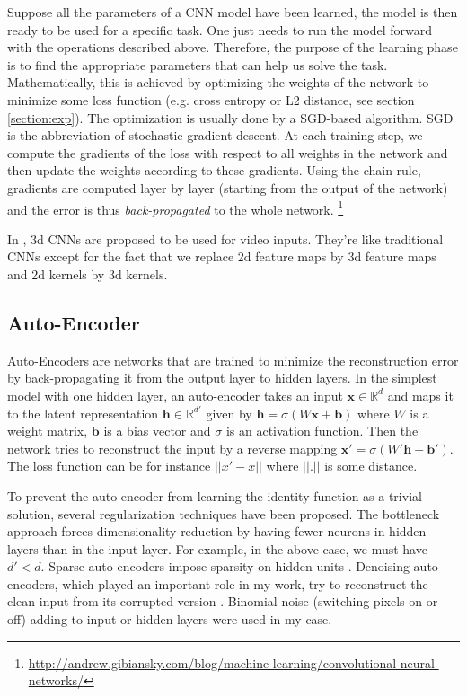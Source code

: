 Suppose all the parameters of a CNN model have been learned, the model
is then ready to be used for a specific task. One just needs to run the
model forward with the operations described above. Therefore,
the purpose of the learning
phase is to find the appropriate parameters that can help us solve the task.
Mathematically, this is achieved by optimizing the weights of the network
to minimize some loss function (e.g. cross entropy
or L2 distance, see section \ref{section:exp}).
The optimization is usually done by a SGD-based algorithm.
SGD is the abbreviation of stochastic gradient descent. At each
training step, we compute the gradients of the loss with respect to all
weights in the network and then update the weights according to these
gradients. Using the chain rule, gradients are computed layer by
layer (starting from the output of the network) and the error is thus
\textit{back-propagated} to the whole network.%
\footnote{
\href{http://andrew.gibiansky.com/blog/machine-learning/convolutional-neural-networks/}
{http://andrew.gibiansky.com/blog/machine-learning/convolutional-neural-networks/}}

In \cite{S. Ji 2013}, 3d CNNs are proposed to be used for video inputs.
They're like traditional CNNs except for the fact that we replace
2d feature maps by 3d feature maps and 2d kernels by 3d kernels.

\subsection{Auto-Encoder} \label{subsection:AE}

Auto-Encoders are networks that are trained to minimize the reconstruction
error by back-propagating it from the output layer to hidden layers.
In the simplest model with one hidden layer, an auto-encoder takes an
input $\mathbf{x} \in \mathbb{R}^d$ and maps it to the latent
representation $\mathbf{h} \in \mathbb{R}^{d'}$ given by
$\mathbf{h} = \sigma(W\mathbf{x}+\mathbf{b})$ where $W$
is a weight matrix, $\mathbf{b}$ is a bias vector and $\sigma$ is an
activation function. Then the network tries to reconstruct the input
by a reverse mapping $\mathbf{x'} = \sigma(W'\mathbf{h}+\mathbf{b'})$.
The loss function can be for instance $||x' - x||$ where $||.||$ is
some distance.

To prevent the auto-encoder from learning the identity function as
a trivial solution, several regularization techniques have been proposed.
The bottleneck approach forces dimensionality reduction by having
fewer neurons in hidden layers than in the input layer. For example,
in the above case, we must have $d'<d$. Sparse auto-encoders impose sparsity
on hidden units \cite{A. Makhzani 2014}.
Denoising auto-encoders, which played an important role in my work,
try to reconstruct the clean input from its corrupted version
\cite{P. Vincent 2008, Y. Bengio 2012}. Binomial noise
(switching pixels on or off) adding
to input or hidden layers were used in my case.

